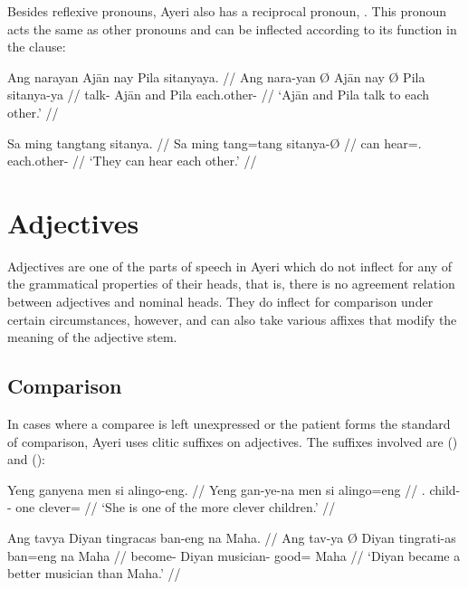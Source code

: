 Besides reflexive pronouns, Ayeri also has a reciprocal pronoun,
. This pronoun acts the same as other pronouns
and can be inflected according to its function in the clause:

\pex
\a\begingl
	\gla Ang narayan {} Ajān nay {} Pila sitanyaya. //
	\glb Ang nara-yan Ø Ajān nay Ø Pila sitanya-ya //
	\glc \AgtT{} talk-\TplM{} \Top{} Ajān and \Top{} Pila each.other-\Loc{} //
	\glft `Ajān and Pila talk to each other.' //
\endgl

\a\begingl
	\gla Sa ming tangtang sitanya. //
	\glb Sa ming tang=tang sitanya-Ø //
	\glc \PatT{} can hear=\TplM{}.\Aarg{} each.other-\Top{} //
	\glft `They can hear each other.' //
\endgl

\xe



\section{Adjectives}
\label{sec:adjectives}

Adjectives are one of the parts of speech in Ayeri which do not inflect for any
of the grammatical properties of their heads, that is, there is no agreement
relation between adjectives and nominal heads. They do inflect for comparison
under certain circumstances, however, and can also take various affixes that
modify the meaning of the adjective stem.

\subsection{Comparison}
\label{subsec:adjcomp}

In cases where a comparee is left unexpressed or the patient forms the 
standard of comparison, Ayeri uses clitic suffixes on adjectives. The suffixes 
involved are  (\Comp{}) and  (\Supl{}):

\pex\label{ex:sfxcomp}
\a\label{ex:sfxcomp2}\begingl
	\gla Yeng ganyena men si alingo-eng. //
	\glb Yeng gan-ye-na men si alingo=eng //
	\glc \TsgF{}.\Aarg{} child-\Pl{}-\Gen{} one \Rel{} clever=\Comp{} //
	\glft `She is one of the more clever children.' //
\endgl

\a\label{ex:sfxcomp1}\begingl
	\gla Ang tavya {} Diyan tingracas ban-eng na Maha. //
	\glb Ang tav-ya Ø Diyan tingrati-as ban=eng na Maha //
	\glc \AgtT{} become-\TsgM{} \Top{} Diyan musician-\Parg{} good=\Comp{} 
		\Gen{} Maha //
	\glft `Diyan became a better musician than Maha.' //
\endgl

